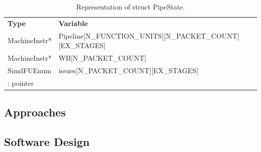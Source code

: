 \begin{table}[b]
\caption{Representation of struct PipeState.}
\begin{center}
\begin{tabular}{@{}l l@{}}
\toprule
\textbf{Type} & \textbf{Variable} \\
MachineInstr* 	& Pipeline[N\_FUNCTION\_UNITS][N\_PACKET\_COUNT][EX\_STAGES]\\
MachineInstr* 	& WB[N\_PACKET\_COUNT]\\
SimdFUEnum	& issues[N\_PACKET\_COUNT][EX\_STAGES]\\
{\small *: pointer}\\
\bottomrule%
\end{tabular}
\end{center}
\label{table:pipe_state}
\end{table}%


\subsection{Approaches}\label{sec:approaches}


\subsection{Software Design}\label{sec:explicit_impl}

